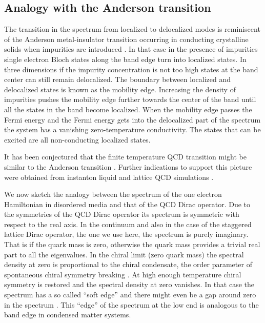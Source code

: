 \documentclass[twocolumn, prd, preprintnumbers, amsmath,
  amssymb, showpacs, floatfix]{revtex4-1}
\begin{document}
\subsection{Analogy with the Anderson transition}

The transition in the spectrum from localized to delocalized modes is
reminiscent of the Anderson metal-insulator transition occurring in conducting
crystalline solids when impurities are introduced \cite{Anderson:1958vr}. In
that case in the presence of impurities single electron Bloch states along the
band edge turn into localized states. In three dimensions if the impurity
concentration is not too high states at the band center can still remain
delocalized. The boundary between localized and delocalized states is known as
the mobility edge. Increasing the density of impurities pushes the mobility
edge further towards the center of the band until all the states in the band
become localized. When the mobility edge passes the Fermi energy and the Fermi
energy gets into the delocalized part of the spectrum the system has a
vanishing zero-temperature conductivity. The states that can be excited are
all non-conducting localized states.

It has been conjectured that the finite temperature QCD transition might be
similar to the Anderson transition \cite{GarciaGarcia:2004hi}. Further
indications to support this picture were obtained from instanton liquid
\cite{GarciaGarcia:2005vj} and lattice QCD simulations
\cite{GarciaGarcia:2006gr}. 

We now sketch the analogy between the spectrum of the one electron Hamiltonian
in disordered media and that of the QCD Dirac operator. Due to the symmetries
of the QCD Dirac operator its spectrum is symmetric with respect to the real
axis. In the continuum and also in the case of the staggered lattice Dirac
operator, the one we use here, the spectrum is purely imaginary. That is if
the quark mass is zero, otherwise the quark mass provides a trivial real part
to all the eigenvalues. In the chiral limit (zero quark mass) the spectral
density at zero is proportional to the chiral condensate, the order parameter
of spontaneous chiral symmetry breaking \cite{Banks:1979yr}. At high enough
temperature chiral symmetry is restored and the spectral density at zero
vanishes. In that case the spectrum has a so called ``soft edge'' and there
might even be a gap around zero in the spectrum
\cite{Farchioni:1999ws,Damgaard:2000cx}. This ``edge'' of the spectrum at the
low end is analogous to the band edge in condensed matter systems.
\end{document}
